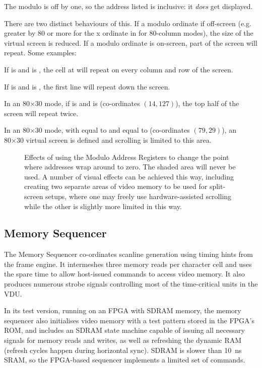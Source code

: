 The modulo is off by one, so the address listed is inclusive: it {\em does\/}
get displayed.

There are two distinct behaviours of this. If a modulo ordinate if off-screen
(e.g. greater by 80 or more for the x ordinate in for 80-column modes), the
size of the virtual screen is reduced. If a modulo ordinate is on-screen, part
of the screen will repeat. Some examples:

If  is  and  is , the cell at
 will repeat on every column and row of the screen.

If  is  and  is , the first line will
repeat down the screen.

In an 80×30 mode, if  is  and  is 
(co-ordinates $(14,127)$), the top half of the screen will repeat twice.

In an 80×30 mode, with  equal to  and  equal to
 (co-ordinates $(79,29)$), an 80×30 virtual screen is defined and scrolling is limited to this
area.

\begin{figure}
 \centering
 
 \caption[Effects of the Modulo Address Register]{\label{fig:vdu-mar} Effects
   of using the Modulo Address Registers to change the point where addresses
   wrap around to zero. The shaded area will never be used. A number of visual
   effects can be achieved this way, including creating two separate areas of
   video memory to be used for split-screen setups, where one may freely use
   hardware-assisted scrolling while the other is slightly more limited in this
   way.}
\end{figure}


\subsection{Memory Sequencer}
\label{sec:vdu:memory-sequencer}

The Memory Sequencer co-ordinates scanline generation using timing hints from
the frame engine. It intermeshes three memory reads per character cell and uses
the spare time to allow host-issued commands to access video memory. It also
produces numerous strobe signals controlling most of the time-critical units in
the VDU.

In its test version, running on an FPGA with \gls{SDRAM} memory, the memory sequencer
also initialises video memory with a test pattern stored in the FPGA's ROM, and
includes an SDRAM state machine capable of issuing all necessary signals for
memory reads and writes, as well as refreshing the dynamic RAM (refresh cycles
happen during horizontal sync). SDRAM is slower than 10~ns SRAM, so the
FPGA-based sequencer implements a limited set of commands.

